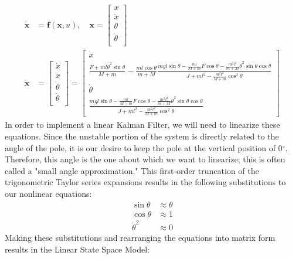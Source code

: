 \documentclass{article}
\newcommand{\matr}[1]{\bm{#1}}     %
\begin{document}
\begin{equation}
\begin{aligned}
\matr{\dot{x}} &= \matr{f}(\matr{x},u),\quad  \matr{x} = \begin{bmatrix}
	x \\
	\dot{x} \\
	\theta \\
	\dot{\theta} \\
\end{bmatrix} \\
\matr{\dot{x}} &= \begin{bmatrix}
	\dot{x} \\
	\ddot{x} \\
	\dot{\theta} \\
	\ddot{\theta} \\
\end{bmatrix} = \begin{bmatrix}
\dot{x} \\
\frac{F+ml\dot{\theta}^2\sin\theta}{M+m} -\frac{ml\cos\theta}{m+M}\frac{mgl\sin\theta- \frac{ml}{M+m} F\cos\theta -\frac{m^2l^2}{m+M}\dot{\theta}^2\sin\theta\cos\theta}{J+ml^2-\frac{m^2l^2}{M+m}\cos^2 \theta} \\[6pt]
\dot{\theta} \\
\frac{mgl\sin\theta - \frac{ml}{M+m} F\cos\theta -\frac{m^2l^2}{m+M}\dot{\theta}^2\sin\theta\cos\theta}{J+ml^2-\frac{m^2l^2}{M+m}\cos^2 \theta }
\end{bmatrix}
\end{aligned}
\label{eq:nonlinear_ss_continuous}
\end{equation}
In order to implement a linear Kalman Filter, we will need to linearize these equations. Since the unstable portion of the system is directly related to the angle of the pole, it is our desire to keep the pole at the vertical position of 0$^\circ$. Therefore, this angle is the one about which we want to linearize; this is often called a "small angle approximation." This first-order truncation of the trigonometric Taylor series expansions results in the following substitutions to our nonlinear equations:
\begin{align*}
\sin \theta &\approx \theta \\
\cos \theta &\approx 1 \\
\dot{\theta}^2 &\approx 0
\end{align*}
Making these substitutions and rearranging the equations into matrix form results in the Linear State Space Model:
\end{document}

